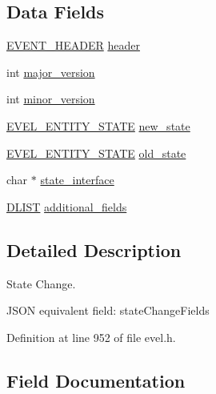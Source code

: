 \subsection*{Data Fields}
\begin{DoxyCompactItemize}
\item 
\hyperlink{evel_8h_aa0ea94c675729365ea7825c4fc7e06d8}{E\+V\+E\+N\+T\+\_\+\+H\+E\+A\+D\+ER} \hyperlink{structevent__state__change_ae1c42b89a04ec5c3852ed9519894f4c5}{header}
\item 
int \hyperlink{structevent__state__change_af815301b2c08b674501a77a5956effdf}{major\+\_\+version}
\item 
int \hyperlink{structevent__state__change_a84c7c8a91ea8937dfcfa5cdc6cec8d83}{minor\+\_\+version}
\item 
\hyperlink{evel_8h_a98a07355771fa850672520cd1e9b1168}{E\+V\+E\+L\+\_\+\+E\+N\+T\+I\+T\+Y\+\_\+\+S\+T\+A\+TE} \hyperlink{structevent__state__change_a80a79f30c9d09fcfb1008a69eb8c0cd8}{new\+\_\+state}
\item 
\hyperlink{evel_8h_a98a07355771fa850672520cd1e9b1168}{E\+V\+E\+L\+\_\+\+E\+N\+T\+I\+T\+Y\+\_\+\+S\+T\+A\+TE} \hyperlink{structevent__state__change_a61cc2c3d53fed278ded76e075676c123}{old\+\_\+state}
\item 
char $\ast$ \hyperlink{structevent__state__change_a4ec776b568e63eb24d10105c39b5c70f}{state\+\_\+interface}
\item 
\hyperlink{double__list_8h_a45f4a129042d9e1aa4ffd31fe13e4d14}{D\+L\+I\+ST} \hyperlink{structevent__state__change_ab140d2d85c7855beac88a6934f8b4cb1}{additional\+\_\+fields}
\end{DoxyCompactItemize}


\subsection{Detailed Description}
State Change. 

J\+S\+ON equivalent field\+: state\+Change\+Fields 

Definition at line 952 of file evel.\+h.



\subsection{Field Documentation}
\hypertarget{structevent__state__change_ab140d2d85c7855beac88a6934f8b4cb1}{}\label{structevent__state__change_ab140d2d85c7855beac88a6934f8b4cb1} 
